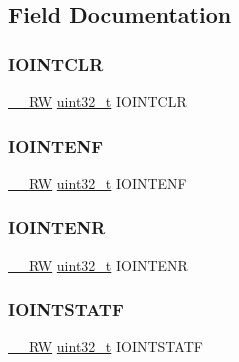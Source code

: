 \subsection{Field Documentation}
\mbox{\label{struct_i_o_int__t_a87adff8c174430dbab8abef6a47f9996}} 
\subsubsection{\texorpdfstring{IOINTCLR}{IOINTCLR}}
{\footnotesize\ttfamily \mbox{\hyperlink{_d_r__tipos_8h_a81f369079976a46554fd9798ab035697}{\+\_\+\+\_\+\+RW}} \mbox{\hyperlink{_d_r__tipos_8h_a435d1572bf3f880d55459d9805097f62}{uint32\+\_\+t}} I\+O\+I\+N\+T\+C\+LR}

\mbox{\label{struct_i_o_int__t_aad549a604c1feac335a25277b6ff5aad}} 
\subsubsection{\texorpdfstring{IOINTENF}{IOINTENF}}
{\footnotesize\ttfamily \mbox{\hyperlink{_d_r__tipos_8h_a81f369079976a46554fd9798ab035697}{\+\_\+\+\_\+\+RW}} \mbox{\hyperlink{_d_r__tipos_8h_a435d1572bf3f880d55459d9805097f62}{uint32\+\_\+t}} I\+O\+I\+N\+T\+E\+NF}

\mbox{\label{struct_i_o_int__t_a9324e5fd584b87239ee9434b10623eb8}} 
\subsubsection{\texorpdfstring{IOINTENR}{IOINTENR}}
{\footnotesize\ttfamily \mbox{\hyperlink{_d_r__tipos_8h_a81f369079976a46554fd9798ab035697}{\+\_\+\+\_\+\+RW}} \mbox{\hyperlink{_d_r__tipos_8h_a435d1572bf3f880d55459d9805097f62}{uint32\+\_\+t}} I\+O\+I\+N\+T\+E\+NR}

\mbox{\label{struct_i_o_int__t_afbf68076b67b0d358ecc2342115d9683}} 
\subsubsection{\texorpdfstring{IOINTSTATF}{IOINTSTATF}}
{\footnotesize\ttfamily \mbox{\hyperlink{_d_r__tipos_8h_a81f369079976a46554fd9798ab035697}{\+\_\+\+\_\+\+RW}} \mbox{\hyperlink{_d_r__tipos_8h_a435d1572bf3f880d55459d9805097f62}{uint32\+\_\+t}} I\+O\+I\+N\+T\+S\+T\+A\+TF}

